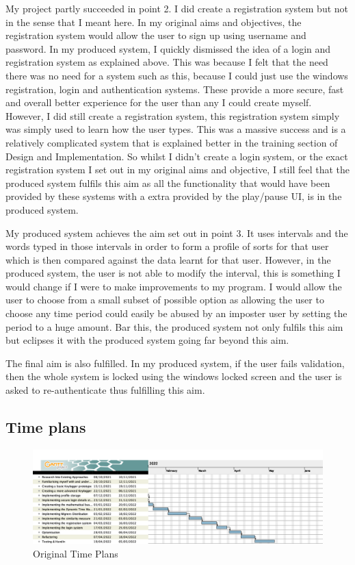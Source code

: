 \documentclass[10pt,a4paper]{report}
\begin{document}
My project partly succeeded in point 2. I did create a registration system but not in the sense that I meant here. In my original aims and objectives, the registration system would allow the user to sign up using username and password. In my produced system, I quickly dismissed the idea of a login and registration system as explained above. This was because I felt that the need there was no need for a system such as this, because I could just use the windows registration, login and authentication systems. These provide a more secure, fast and overall better experience for the user than any I could create myself. However, I did still create a registration system, this registration system simply was simply used to learn how the user types. This was a massive success and is a relatively complicated system that is explained better in the training section of Design and Implementation. So whilst I didn't create a login system, or the exact registration system I set out in my original aims and objective, I still feel that the produced system fulfils this aim as all the functionality that would have been provided by these systems with a extra provided by the play/pause UI, is in the produced system.

My produced system achieves the aim set out in point 3. It uses intervals and the words typed in those intervals in order to form a profile of sorts for that user which is then compared against the data learnt for that user. However, in the produced system, the user is not able to modify the interval, this is something I would change if I were to make improvements to my program. I would allow the user to choose from a small subset of possible option as allowing the user to choose any time period could easily be abused by an imposter user by setting the period to a huge amount. Bar this, the produced system not only fulfils this aim but eclipses it with the produced system going far beyond this aim.

The final aim is also fulfilled. In my produced system, if the user fails validation, then the whole system is locked using the windows locked screen and the user is asked to re-authenticate thus fulfilling this aim.


\subsection{Time plans}

\begin{figure}[h]
	\centering
	\includegraphics[scale=0.27]{GantChartAll}
	\caption{Original Time Plans}
	\label{fig:GAll}
\end{figure}
\end{document}
